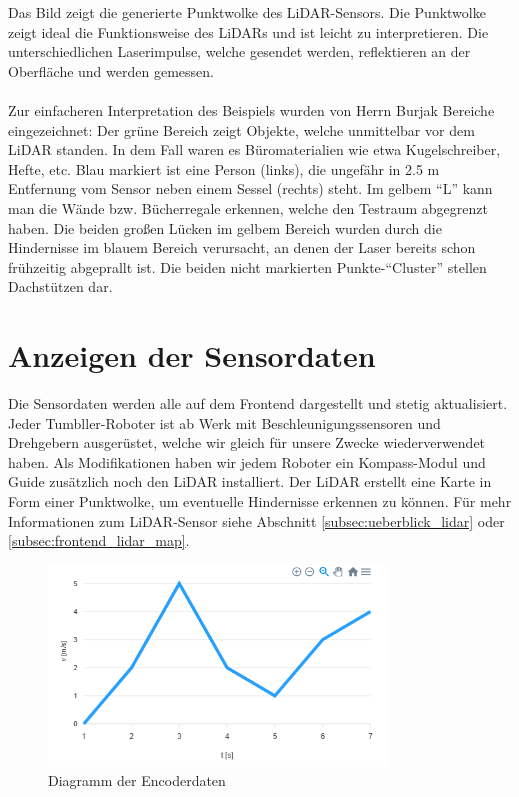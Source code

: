 Das Bild zeigt die generierte Punktwolke des LiDAR-Sensors.
%
Die Punktwolke zeigt ideal die Funktionsweise des LiDARs
und ist leicht zu interpretieren.
%
Die unterschiedlichen Laserimpulse,
welche gesendet werden,
reflektieren an der Oberfläche und werden gemessen.
\\\\
Zur einfacheren Interpretation des Beispiels
wurden von Herrn Burjak Bereiche eingezeichnet:
%
Der grüne Bereich zeigt Objekte,
welche unmittelbar vor dem LiDAR standen.
%
In dem Fall waren es Büromaterialien wie etwa Kugelschreiber, Hefte, etc.
%
Blau markiert ist eine Person (links),
die ungefähr in 2.5 m Entfernung vom Sensor
neben einem Sessel (rechts) steht.
%
Im gelbem ``L'' kann man die Wände bzw. Bücherregale erkennen,
welche den Testraum abgegrenzt haben.
Die beiden großen Lücken im gelbem Bereich wurden
durch die Hindernisse im blauem Bereich verursacht,
an denen der Laser bereits schon frühzeitig abgeprallt ist.
%
Die beiden nicht markierten Punkte-``Cluster'' stellen Dachstützen dar.

\section{Anzeigen der Sensordaten}
\label{subsec:frontend_sensors}
Die Sensordaten werden alle auf dem Frontend dargestellt und stetig aktualisiert.
%
Jeder Tumbller-Roboter ist ab Werk mit Beschleunigungssensoren und Drehgebern ausgerüstet,
welche wir gleich für unsere Zwecke wiederverwendet haben.
%
Als Modifikationen haben wir jedem Roboter ein Kompass-Modul
und Guide zusätzlich noch den LiDAR installiert.
%
Der LiDAR erstellt eine Karte in Form einer Punktwolke,
um eventuelle Hindernisse erkennen zu können.
%
Für mehr Informationen zum LiDAR-Sensor siehe Abschnitt \ref{subsec:ueberblick_lidar} oder \ref{subsec:frontend_lidar_map}.

\begin{figure}[H]
    \includegraphics[width=0.8\textwidth, center]{img/encoder_chart.png}
    \caption{Diagramm der Encoderdaten}
    \label{fig:Encoderdaten}
\end{figure}

